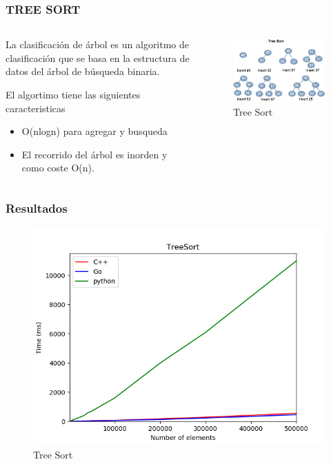 \documentclass[
	11pt, %
]{beamer}
\begin{document}
\begin{frame}
	\frametitle{TREE SORT}
    \begin{columns}[t] %
		\begin{column}{0.45\textwidth} %
			 La clasificación de árbol es un algoritmo de clasificación que se basa en la estructura de datos del árbol de búsqueda binaria.

            El algortimo tiene las siguientes caracteristicas
            \begin{itemize}
              \item O(nlogn) para agregar y busqueda
              \item El recorrido del árbol es inorden y como coste O(n).
            \end{itemize}
		\end{column}		
		\begin{column}{0.5\textwidth} %
			\begin{figure}
		      \includegraphics[width=0.8\linewidth]{treesorttwo_1.png}
		      \caption{Tree Sort}
	   \end{figure}
		
		\end{column}
	\end{columns}
\end{frame}

\begin{frame}
	\frametitle{Resultados}
	
	\begin{figure}
		\includegraphics[width=0.8\linewidth]{treeSort_1.png}
		\caption{Tree Sort}
	\end{figure}
\end{frame}
\end{document}
